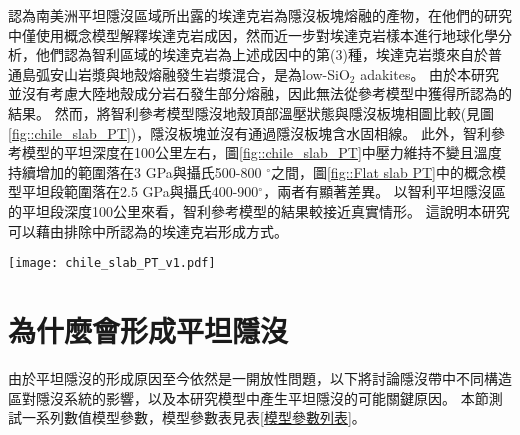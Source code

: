 \citet{Gutscher2000Bcan}認為南美洲平坦隱沒區域所出露的埃達克岩為隱沒板塊熔融的產物，在他們的研究中僅使用概念模型解釋埃達克岩成因，然而\citet{kay2002magmatism}近一步對埃達克岩樣本進行地球化學分析，他們認為智利區域的埃達克岩為上述成因中的第(3)種，埃達克岩漿來自於普通島弧安山岩漿與地殼熔融發生岩漿混合，是為low-SiO$_2$ adakites。
由於本研究並沒有考慮大陸地殼成分岩石發生部分熔融，因此無法從參考模型中獲得\citet{kay2002magmatism}所認為的結果。
然而，將智利參考模型隱沒地殼頂部溫壓狀態與隱沒板塊相圖比較(見圖\ref{fig::chile_slab_PT})，隱沒板塊並沒有通過隱沒板塊含水固相線。
此外，智利參考模型的平坦深度在100公里左右，圖\ref{fig::chile_slab_PT}中壓力維持不變且溫度持續增加的範圍落在3 GPa與攝氏500-800 $^{\circ}$之間，圖\ref{fig::Flat slab PT}中\citet{Gutscher2000Bcan}的概念模型平坦段範圍落在2.5 GPa與攝氏400-900$^{\circ}$，兩者有顯著差異。
以智利平坦隱沒區的平坦段深度100公里來看，智利參考模型的結果較接近真實情形。
這說明本研究可以藉由排除\citet{Gutscher2000Bcan}中所認為的埃達克岩形成方式。

\begin{figure*}[ht!]
    \centering
    \texttt{[image: chile\_slab\_PT\_v1.pdf]}
    \caption[智利參考模型隱沒地殼頂部於40 Myr的溫壓圖]{智利參考模型隱沒地殼頂部於40 Myr的溫壓圖。其中綠線為本研究中玄武岩至榴輝岩的相變條件，橘色線為含水固相線。綠色點為隱沒地殼頂部每2-5公里的溫壓狀態。
    }
    \label{fig::chile_slab_PT}
\end{figure*}

\newpage
\section{為什麼會形成平坦隱沒}
由於平坦隱沒的形成原因至今依然是一開放性問題，以下將討論隱沒帶中不同構造區對隱沒系統的影響，以及本研究模型中產生平坦隱沒的可能關鍵原因。
本節測試一系列數值模型參數，模型參數表見表\ref{模型參數列表}。

